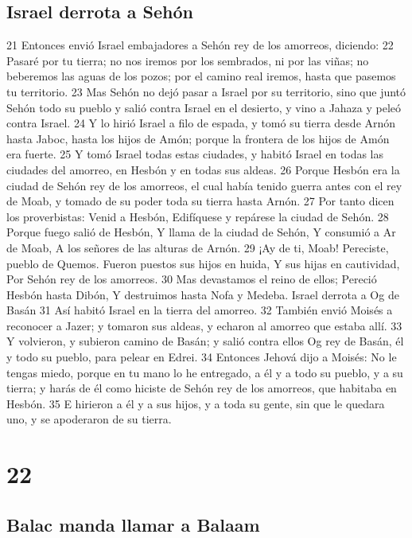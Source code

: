 \section*{Israel derrota a Sehón }

21 Entonces envió Israel embajadores a Sehón rey de los amorreos, diciendo:
22 Pasaré por tu tierra; no nos iremos por los sembrados, ni por las viñas; no beberemos las aguas de los pozos; por el camino real iremos, hasta que pasemos tu territorio.
23 Mas Sehón no dejó pasar a Israel por su territorio, sino que juntó Sehón todo su pueblo y salió contra Israel en el desierto, y vino a Jahaza y peleó contra Israel.
24 Y lo hirió Israel a filo de espada, y tomó su tierra desde Arnón hasta Jaboc, hasta los hijos de Amón; porque la frontera de los hijos de Amón era fuerte.
25 Y tomó Israel todas estas ciudades, y habitó Israel en todas las ciudades del amorreo, en Hesbón y en todas sus aldeas.
26 Porque Hesbón era la ciudad de Sehón rey de los amorreos, el cual había tenido guerra antes con el rey de Moab, y tomado de su poder toda su tierra hasta Arnón.
27 Por tanto dicen los proverbistas:
Venid a Hesbón,
Edifíquese y repárese la ciudad de Sehón. 
28 Porque fuego salió de Hesbón,
Y llama de la ciudad de Sehón,
Y consumió a Ar de Moab,
A los señores de las alturas de Arnón.
29 ¡Ay de ti, Moab!
Pereciste, pueblo de Quemos.
Fueron puestos sus hijos en huida,
Y sus hijas en cautividad,
Por Sehón rey de los amorreos.
30 Mas devastamos el reino de ellos;
Pereció Hesbón hasta Dibón,
Y destruimos hasta Nofa y Medeba.
Israel derrota a Og de Basán 
31 Así habitó Israel en la tierra del amorreo.
32 También envió Moisés a reconocer a Jazer; y tomaron sus aldeas, y echaron al amorreo que estaba allí.
33 Y volvieron, y subieron camino de Basán; y salió contra ellos Og rey de Basán, él y todo su pueblo, para pelear en Edrei.
34 Entonces Jehová dijo a Moisés: No le tengas miedo, porque en tu mano lo he entregado, a él y a todo su pueblo, y a su tierra; y harás de él como hiciste de Sehón rey de los amorreos, que habitaba en Hesbón.
35 E hirieron a él y a sus hijos, y a toda su gente, sin que le quedara uno, y se apoderaron de su tierra.

\chapter{22}

\section*{Balac manda llamar a Balaam}


